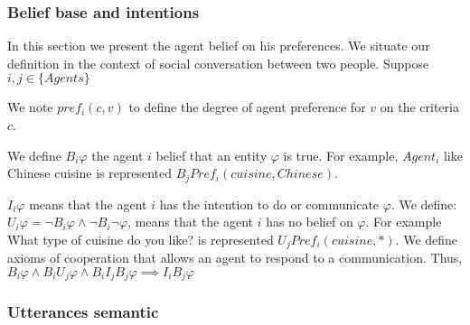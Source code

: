 \documentclass{llncs}
\begin{document}
\subsubsection{Belief base and intentions}
In this section we present the agent belief on his preferences. We situate our definition in the context of social conversation between two people. Suppose $i,j \in \{Agents\}$
\par We note $pref_{i} (c,v)$ to define the degree of agent preference for $v$ on the criteria $c$.

 We define $ B_{i} \varphi$ the agent $i$  belief that an entity $\varphi$ is true. For example, $Agent_{i}$ like Chinese cuisine is represented $ B_{j} Pref_{i}(cuisine, Chinese)$.
 
  $I_{i} \varphi$ means that the agent $i$ has the intention to do or communicate $\varphi$. We define: $U_{i} \varphi = \neg B_{i} \varphi \land \neg B_{i} \neg \varphi$, means that the agent $i$ has no belief on $\varphi$. For example What type of cuisine do you like? is represented $U_{j} Pref_{i}(cuisine,*)$. We define axioms of cooperation that allows an agent to respond to a communication. Thus, $ B_{i} \varphi \land  B_{i} U_{j} \varphi \land  B_{i} I_{j}  B_{j} \varphi \implies I_{i}  B_{j} \varphi  $
 
\subsubsection{Utterances semantic}
\end{document}
